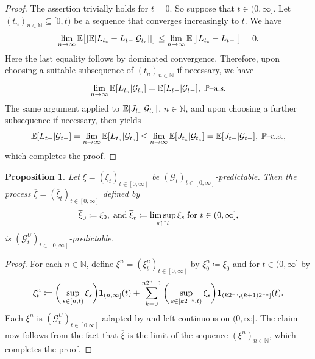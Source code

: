\documentclass[10pt]{article} %
\newtheorem{proposition}[theorem]{Proposition}
\newcommand\cG{\mathcal G}
\newcommand{\smalltext}[1]{\text{\fontsize{4}{4}\selectfont$#1$}}
\def \E{\mathbb{E}}
\def \N{\mathbb{N}}
\def \P{\mathbb{P}}
\newcommand{\1}{\mathbf{1}}
\begin{document}
\begin{proof}
	The assertion trivially holds for $t = 0$. So suppose that $t \in (0,\infty]$. Let $(t_n)_{n \in \N} \subseteq [0,t)$ be a sequence that converges increasingly to $t$. We have
	\begin{equation*}
		\lim_{n \rightarrow \infty}\E\big[|\E[L_{t_\smalltext{n}}-L_{t-}|\cG_{t_\smalltext{n}}]|\big] \leq \lim_{n \rightarrow \infty} \E\big[|L_{t_\smalltext{n}}-L_{t-}|\big] = 0.
	\end{equation*}
	Here the last equality follows by dominated convergence. Therefore, upon choosing a suitable subsequence of $(t_n)_{n \in \N}$ if necessary, we have
	\begin{equation*}
		\lim_{n \rightarrow \infty}\E[L_{t_\smalltext{n}}|\cG_{t_\smalltext{n}}] = \E[L_{t-}|\cG_{t-}], \; \text{$\P$--a.s.}
	\end{equation*}
	The same argument applied to $\E[J_{t_\smalltext{n}}|\cG_{t_\smalltext{n}}]$, $n \in \N$, and upon choosing a further subsequence if necessary, then yields
	\begin{equation*}
		\E[L_{t-}|\cG_{t-}] = \lim_{n \rightarrow \infty}\E[L_{t_\smalltext{n}}|\cG_{t_\smalltext{n}}] \leq \lim_{n \rightarrow \infty}\E[J_{t_\smalltext{n}}|\cG_{t_\smalltext{n}}]  = \E[J_{t-}|\cG_{t-}], \; \text{$\P$--a.s.},
	\end{equation*}
	which completes the proof.
\end{proof}

\begin{proposition}\label{prop::pred_left_limit}
	Let $\xi = (\xi_t)_{t \in [0,\infty]}$ be $(\cG_t)_{t \in [0,\infty]}$-predictable. Then the process $\overline\xi = (\overline\xi_t)_{t \in [0,\infty]}$ defined by
\begin{equation*}
	\overline\xi_0 \coloneqq \xi_0, \; \text{\rm and} \; \overline\xi_t \coloneqq \limsup_{s \uparrow\uparrow t} \xi_s \; \text{\rm for $t \in (0,\infty]$},
\end{equation*}
is $(\cG^U_t)_{t \in [0,\infty]}$-predictable.
\end{proposition}

\begin{proof}
	For each $n \in \mathbb{N}$, define $\xi^n = (\xi^n_t)_{t \in [0,\infty]}$ by $\xi^n_0 \coloneqq \xi_0$ and for $t \in (0,\infty]$ by
	\begin{equation*}
		\xi^n_t \coloneqq \bigg(\sup_{s \in [n,t)} \xi_s \bigg)\mathbf{1}_{(n,\infty]}(t) + \sum_{k = 0}^{n2^\smalltext{n}-1} \bigg(\sup_{s \in [k2^{\smalltext{-}\smalltext{n}},t)}\xi_s\bigg) \mathbf{1}_{(k2^{\smalltext{-}\smalltext{n}}, (k+1)2^{\smalltext{-}\smalltext{n}}]}(t).
	\end{equation*}
	Each $\xi^n$ is $(\cG^U_t)_{t \in [0.\infty]}$-adapted by \cite[Proposition 2.21]{karoui2013capacities} and left-continuous on $(0,\infty]$. The claim now follows from the fact that $\overline\xi$ is the limit of the sequence $(\xi^n)_{n \in \N}$, which completes the proof.
\end{proof}
\end{document}
